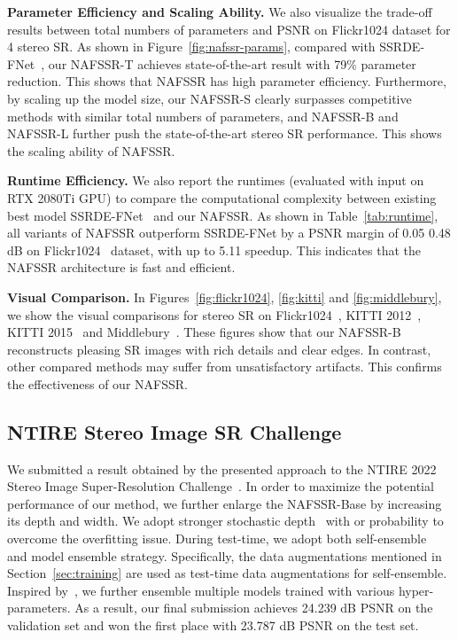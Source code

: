 \documentclass[10pt,twocolumn,letterpaper]{article}
\begin{document}
\textbf{Parameter Efficiency and Scaling Ability.} We also visualize the trade-off results between total numbers of parameters and PSNR on Flickr1024 dataset for 4 stereo SR. As shown in Figure~\ref{fig:nafssr-params}, compared with SSRDE-FNet~\cite{dai2021feedback}, our NAFSSR-T achieves state-of-the-art result with 79\% parameter reduction. This shows that NAFSSR has high parameter efficiency. 
Furthermore, by scaling up the model size, our NAFSSR-S clearly surpasses competitive methods with similar total numbers of parameters, and NAFSSR-B and NAFSSR-L further push the state-of-the-art stereo SR performance. This shows the scaling ability of NAFSSR.

\textbf{Runtime Efficiency.} 
We also report the runtimes (evaluated with  input on RTX 2080Ti GPU) to compare the computational complexity between existing best model SSRDE-FNet~\cite{dai2021feedback} and our NAFSSR. As shown in Table~\ref{tab:runtime}, all variants of NAFSSR outperform SSRDE-FNet by a PSNR margin of 0.05  0.48 dB
on Flickr1024~\cite{wang2019learning} dataset, with up to 5.11 speedup.
This indicates that the NAFSSR architecture is fast and efficient.

\textbf{Visual Comparison.}
In Figures~\ref{fig:flickr1024}, \ref{fig:kitti} and \ref{fig:middlebury}, we show the visual comparisons for  stereo SR on Flickr1024~\cite{wang2019learning}, KITTI 2012~\cite{geiger2012we}, KITTI 2015~\cite{menze2015object} and  Middlebury~\cite{scharstein2014high}. 
These figures show that our NAFSSR-B reconstructs pleasing SR images with rich details and clear edges. In contrast, other compared methods may suffer from unsatisfactory artifacts.
This confirms the effectiveness of our NAFSSR.


 \subsection{NTIRE Stereo Image SR Challenge}
We submitted a result obtained by the presented approach
to the NTIRE 2022 Stereo Image Super-Resolution Challenge~\cite{Wang2022NTIRE}.
In order to maximize the potential performance of our method, we further enlarge the NAFSSR-Base by increasing its depth and width. We adopt stronger stochastic depth~\cite{huang2016deep} with  or  probability to overcome the overfitting issue. During test-time, we adopt both self-ensemble~\cite{lim2017enhanced} and model ensemble strategy. Specifically, the data augmentations mentioned in Section~\ref{sec:training} are used as test-time data augmentations for self-ensemble. Inspired by~\cite{wortsman2022model}, we further ensemble multiple models trained with various hyper-parameters. As a result, our final submission achieves 24.239 dB PSNR on the validation set and won the first place with 23.787 dB PSNR on the test set.
\end{document}
